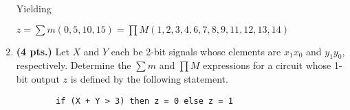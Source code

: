 \begin{enumerate}
\begin{onlysolution}
                            Yielding

                            $z = \sum m(0,5,10,15) = \prod M(1,2,3,4,6,7,8,9,11,12,13,14)$
                        \end{onlysolution}

                    \item \textbf{ (4 pts.)} Let $X$ and $Y$ each be 2-bit signals whose
                        elements are $x_1 x_0$ and $y_1 y_0$, respectively.  Determine the
                        $\sum m$ and $\prod M$ expressions for a circuit whose 1-bit
                        output $z$ is defined by the following statement.
\begin{verbatim}
        if (X + Y > 3) then z = 0 else z = 1
\end{verbatim}


\end{enumerate}
